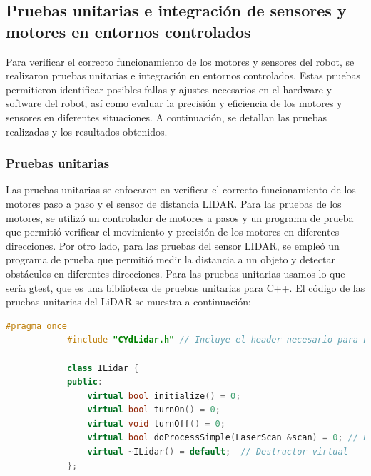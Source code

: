 \subsection{Pruebas unitarias e integraci\'on de sensores y motores en entornos controlados} %
\label{sub:Prub01}

    Para verificar el correcto funcionamiento de los motores y sensores del robot, se realizaron pruebas unitarias e integraci\'on en entornos controlados. 
    Estas pruebas permitieron identificar posibles fallas y ajustes necesarios en el hardware y software del robot, as\'i como evaluar la precisi\'on y 
    eficiencia de los motores y sensores en diferentes situaciones. A continuaci\'on, se detallan las pruebas realizadas y los resultados obtenidos.

    \subsubsection{Pruebas unitarias} %
    \label{ssub:Pruebas unitarias}
        Las pruebas unitarias se enfocaron en verificar el correcto funcionamiento de los motores paso a paso y el sensor de distancia LIDAR. 
        Para las pruebas de los motores, se utiliz\'o un controlador de motores a pasos y un programa de prueba que permiti\'o verificar el 
        movimiento y precisi\'on de los motores en diferentes direcciones. Por otro lado, para las pruebas del sensor LIDAR, se emple\'o un 
        programa de prueba que permiti\'o medir la distancia a un objeto y detectar obst\'aculos en diferentes direcciones. 
        Para las pruebas unitarias usamos lo que ser\'ia gtest, que es una biblioteca de pruebas unitarias para C++.
        \vskip 0.5cm
        El c\'odigo de las pruebas unitarias del LiDAR se muestra a continuaci\'on:
        \begin{lstlisting}[language={C++}, caption={ILidar.h}, label={Script}]
            #pragma once
            #include "CYdLidar.h" // Incluye el header necesario para LaserScan
            
            class ILidar {
            public:
                virtual bool initialize() = 0;
                virtual bool turnOn() = 0;
                virtual void turnOff() = 0;
                virtual bool doProcessSimple(LaserScan &scan) = 0; // Procesa el escaneo de LiDAR
                virtual ~ILidar() = default;  // Destructor virtual
            };            
        \end{lstlisting}
